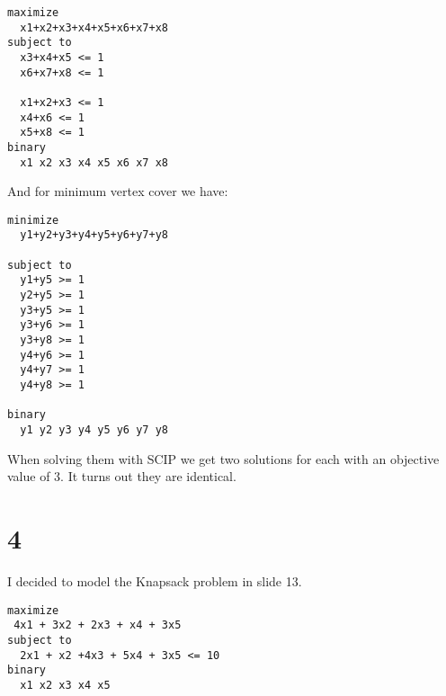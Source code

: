\documentclass[12pt]{report}
\begin{document}
\begin{verbatim}
maximize
  x1+x2+x3+x4+x5+x6+x7+x8
subject to
  x3+x4+x5 <= 1
  x6+x7+x8 <= 1

  x1+x2+x3 <= 1
  x4+x6 <= 1
  x5+x8 <= 1
binary
  x1 x2 x3 x4 x5 x6 x7 x8
\end{verbatim}

And for minimum vertex cover we have:

\begin{verbatim}
minimize
  y1+y2+y3+y4+y5+y6+y7+y8

subject to
  y1+y5 >= 1
  y2+y5 >= 1
  y3+y5 >= 1
  y3+y6 >= 1
  y3+y8 >= 1
  y4+y6 >= 1
  y4+y7 >= 1
  y4+y8 >= 1

binary
  y1 y2 y3 y4 y5 y6 y7 y8
\end{verbatim}

When solving them with SCIP we get two solutions for each with an objective value of 3. It turns out they are identical. 


\section*{4}

I decided to model the Knapsack problem in slide 13.


\begin{verbatim}
maximize
 4x1 + 3x2 + 2x3 + x4 + 3x5 
subject to
  2x1 + x2 +4x3 + 5x4 + 3x5 <= 10
binary
  x1 x2 x3 x4 x5
\end{verbatim}
\end{document}
